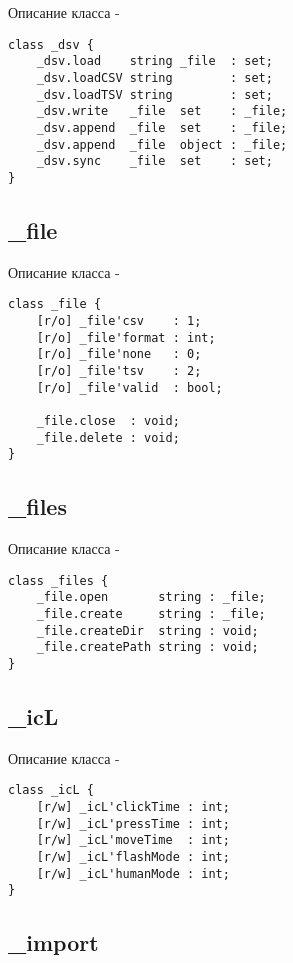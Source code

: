 \noindent Описание класса  -
\begin{lstlisting}[numbers=none]
class _dsv {
	_dsv.load    string _file  : set;
	_dsv.loadCSV string        : set;
	_dsv.loadTSV string        : set;
	_dsv.write   _file  set    : _file;
	_dsv.append  _file  set    : _file;
	_dsv.append  _file  object : _file;
	_dsv.sync    _file  set    : set;
}
\end{lstlisting}

\subsection{{\color{orange} \_file}}

\noindent Описание класса  -
\begin{lstlisting}[numbers=none]
class _file {
	[r/o] _file'csv    : 1;
	[r/o] _file'format : int;
	[r/o] _file'none   : 0;
	[r/o] _file'tsv    : 2;
	[r/o] _file'valid  : bool;
	
	_file.close  : void;
	_file.delete : void;
}
\end{lstlisting}

\subsection{{\color{orange} \_files}}

\noindent Описание класса  -
\begin{lstlisting}[numbers=none]
class _files {
	_file.open       string : _file;
	_file.create     string : _file;
	_file.createDir  string : void;
	_file.createPath string : void;
}
\end{lstlisting}

\subsection{{\color{orange} \_icL}}

\noindent Описание класса  -
\begin{lstlisting}[numbers=none]
class _icL {
	[r/w] _icL'clickTime : int;
	[r/w] _icL'pressTime : int;
	[r/w] _icL'moveTime  : int;
	[r/w] _icL'flashMode : int;
	[r/w] _icL'humanMode : int;
}
\end{lstlisting}

\subsection{{\color{orange} \_import}}

